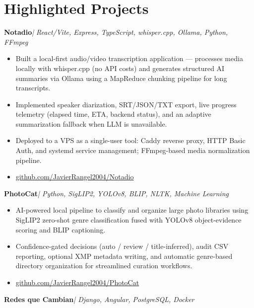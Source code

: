 \documentclass[11pt, letterpaper]{article}
\newenvironment{cvlist}{%
  \begin{itemize}[leftmargin=1.4em,itemsep=1.5pt,topsep=3pt,parsep=0pt]
}{\end{itemize}}
\newcommand{\project}[2]{\noindent\textbf{#1}\hspace{4pt}\textit{| #2}}
\begin{document}
\section{Highlighted Projects}

\project{Notadio}%
        {React/Vite, Express, TypeScript, whisper.cpp, Ollama, Python, FFmpeg}

\begin{cvlist}
  \item Built a local-first audio/video transcription application — processes media
        locally with whisper.cpp (no API costs) and generates structured AI summaries
        via Ollama using a MapReduce chunking pipeline for long transcripts.
  \item Implemented speaker diarization, SRT/JSON/TXT export, live progress telemetry
        (elapsed time, ETA, backend status), and an adaptive summarization fallback
        when LLM is unavailable.
  \item Deployed to a VPS as a single-user tool: Caddy reverse proxy, HTTP Basic Auth,
        and systemd service management; FFmpeg-based media normalization pipeline.
  \item \href{https://github.com/JavierRangel2004/Notadio}{github.com/JavierRangel2004/Notadio}
\end{cvlist}

\vspace{4pt}

\project{PhotoCat}%
        {Python, SigLIP2, YOLOv8, BLIP, NLTK, Machine Learning}

\begin{cvlist}
  \item AI-powered local pipeline to classify and organize large photo libraries
        using SigLIP2 zero-shot genre classification fused with YOLOv8
        object-evidence scoring and BLIP captioning.
  \item Confidence-gated decisions (auto / review / title-inferred), audit CSV
        reporting, optional XMP metadata writing, and automatic genre-based
        directory organization for streamlined curation workflows.
  \item \href{https://github.com/JavierRangel2004/PhotoCat}{github.com/JavierRangel2004/PhotoCat}
\end{cvlist}

\vspace{4pt}

\project{Redes que Cambian}%
        {Django, Angular, PostgreSQL, Docker}
\end{document}
